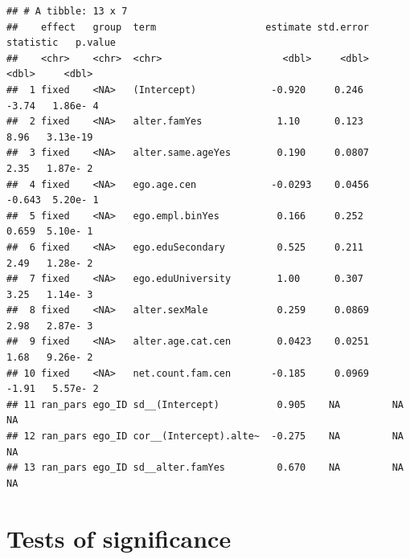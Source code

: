 \documentclass[
]{book}
\begin{document}
\begin{verbatim}
## # A tibble: 13 x 7
##    effect   group  term                   estimate std.error statistic   p.value
##    <chr>    <chr>  <chr>                     <dbl>     <dbl>     <dbl>     <dbl>
##  1 fixed    <NA>   (Intercept)             -0.920     0.246     -3.74   1.86e- 4
##  2 fixed    <NA>   alter.famYes             1.10      0.123      8.96   3.13e-19
##  3 fixed    <NA>   alter.same.ageYes        0.190     0.0807     2.35   1.87e- 2
##  4 fixed    <NA>   ego.age.cen             -0.0293    0.0456    -0.643  5.20e- 1
##  5 fixed    <NA>   ego.empl.binYes          0.166     0.252      0.659  5.10e- 1
##  6 fixed    <NA>   ego.eduSecondary         0.525     0.211      2.49   1.28e- 2
##  7 fixed    <NA>   ego.eduUniversity        1.00      0.307      3.25   1.14e- 3
##  8 fixed    <NA>   alter.sexMale            0.259     0.0869     2.98   2.87e- 3
##  9 fixed    <NA>   alter.age.cat.cen        0.0423    0.0251     1.68   9.26e- 2
## 10 fixed    <NA>   net.count.fam.cen       -0.185     0.0969    -1.91   5.57e- 2
## 11 ran_pars ego_ID sd__(Intercept)          0.905    NA         NA     NA       
## 12 ran_pars ego_ID cor__(Intercept).alte~  -0.275    NA         NA     NA       
## 13 ran_pars ego_ID sd__alter.famYes         0.670    NA         NA     NA
\end{verbatim}

\hypertarget{tests-of-significance}{%
\section{Tests of significance}\label{tests-of-significance}}
\end{document}
